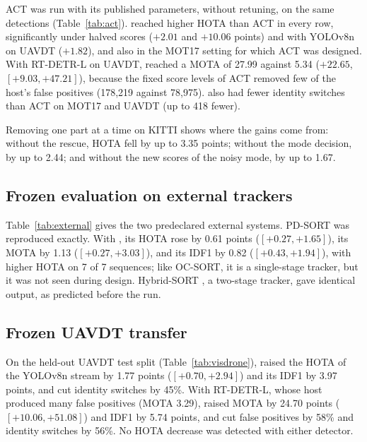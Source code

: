 ACT \cite{act2026adaptive} was run with its published parameters, without retuning, on the same detections
(Table~\ref{tab:act}). \scl{} reached higher HOTA than ACT in every row, significantly under halved
scores ($+2.01$ and $+10.06$ points) and with YOLOv8n on UAVDT ($+1.82$), and also in the MOT17
setting for which ACT was designed. With RT-DETR-L on UAVDT, \scl{} reached a MOTA of 27.99 against
5.34 ($+22.65$, $[+9.03,+47.21]$), because the fixed score levels of ACT removed few of the host's
false positives (178,219 against 78,975). \scl{} also had fewer identity switches than ACT on
MOT17 and UAVDT (up to 418 fewer).

Removing one part at a time on KITTI shows where the gains come from: without the rescue, HOTA
fell by up to 3.35 points; without the mode decision, by up to 2.44; and without the new scores of
the noisy mode, by up to 1.67.


\subsection{Frozen evaluation on external trackers}\label{sec:external}
Table~\ref{tab:external} gives the two predeclared external systems. PD-SORT \cite{wang2025pdsort}
was reproduced exactly. With \scl{}, its HOTA rose by 0.61 points ($[+0.27,+1.65]$), its MOTA by
1.13 ($[+0.27,+3.03]$), and its IDF1 by 0.82 ($[+0.43,+1.94]$), with higher HOTA on 7 of 7
sequences; like OC-SORT, it is a single-stage tracker, but it was not seen during design.
Hybrid-SORT \cite{yang2024hybridsort}, a two-stage tracker, gave identical output, as predicted
before the run.


\subsection{Frozen UAVDT transfer}\label{sec:visdrone}
On the held-out UAVDT test split (Table~\ref{tab:visdrone}), \scl{} raised the HOTA of the YOLOv8n
stream by 1.77 points ($[+0.70,+2.94]$) and its IDF1 by 3.97 points, and cut identity switches by
45\%. With RT-DETR-L, whose host produced many false positives (MOTA 3.29), \scl{} raised MOTA by
24.70 points ($[+10.06,+51.08]$) and IDF1 by 5.74 points, and cut false positives by 58\% and
identity switches by 56\%. No HOTA decrease was detected with either detector.

